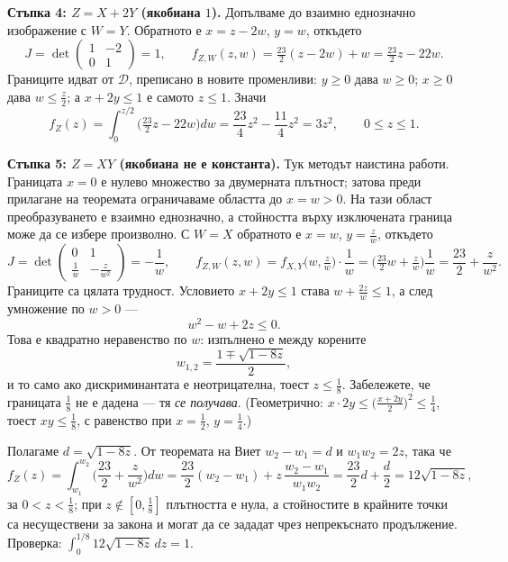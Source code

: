 \begin{supp}
\textbf{Стъпка 4: $Z = X+2Y$ (якобиана $1$).} Допълваме до взаимно еднозначно изображение с
$W = Y$. Обратното е $x = z-2w$, $y = w$, откъдето
\[
J = \det\begin{pmatrix} 1 & -2 \\ 0 & 1\end{pmatrix} = 1,
\qquad
f_{Z,W}(z,w) = \tfrac{23}{2}(z-2w) + w = \tfrac{23}{2}z - 22w .
\]
Границите идват от $\mathcal{D}$, преписано в новите променливи: $y \ge 0$ дава $w \ge 0$;
$x \ge 0$ дава $w \le \frac z2$; а $x + 2y \le 1$ е самото $z \le 1$. Значи
\[
f_Z(z) = \int_0^{z/2}\Big(\tfrac{23}{2}z-22w\Big) dw = \frac{23}{4}z^2 - \frac{11}{4}z^2 = 3z^2,
\qquad 0 \le z \le 1 .
\]

\textbf{Стъпка 5: $Z = XY$ (якобиана не е константа).} Тук методът наистина работи. Границата $x=0$ е нулево множество за двумерната плътност; затова преди прилагане на теоремата ограничаваме областта до $x=w>0$. На тази област преобразуването е взаимно еднозначно, а стойността върху изключената граница може да се избере произволно. С
$W = X$ обратното е $x = w$, $y = \frac zw$, откъдето
\[
J = \det\begin{pmatrix} 0 & 1 \\[2pt] \tfrac1w & -\tfrac{z}{w^2}\end{pmatrix} = -\frac1w,
\qquad
f_{Z,W}(z,w) = f_{X,Y}\Big(w, \tfrac zw\Big)\cdot\frac1w
= \Big(\tfrac{23}{2}w + \tfrac zw\Big)\frac1w = \frac{23}{2} + \frac{z}{w^2} .
\]
Границите са цялата трудност. Условието $x+2y \le 1$ става $w + \frac{2z}{w} \le 1$, а след
умножение по $w > 0$ —
\[
w^2 - w + 2z \le 0 .
\]
Това е квадратно неравенство по $w$: изпълнено е между корените
\[
w_{1,2} = \frac{1 \mp \sqrt{1-8z}}{2},
\]
и то само ако дискриминантата е неотрицателна, тоест $z \le \frac18$. Забележете, че
границата $\frac18$ не е дадена — тя \emph{се получава}. (Геометрично: $x\cdot 2y \le
\big(\frac{x+2y}{2}\big)^2 \le \frac14$, тоест $xy \le \frac18$, с равенство при
$x=\frac12$, $y=\frac14$.)

Полагаме $d = \sqrt{1-8z}$. От теоремата на Виет $w_2-w_1 = d$ и $w_1w_2 = 2z$, така че
\[
f_Z(z) = \int_{w_1}^{w_2}\Big(\frac{23}{2}+\frac{z}{w^2}\Big) dw
= \frac{23}{2}(w_2-w_1) + z\,\frac{w_2-w_1}{w_1w_2}
= \frac{23}{2}d + \frac{d}{2} = 12\sqrt{1-8z},
\]
за $0<z<\frac18$; при $z\notin[0,\frac18]$ плътността е нула, а стойностите в крайните точки са несуществени за закона и могат да се зададат чрез непрекъснато продължение. Проверка: $\int_0^{1/8} 12\sqrt{1-8z}\,dz = 1$.


\end{supp}
